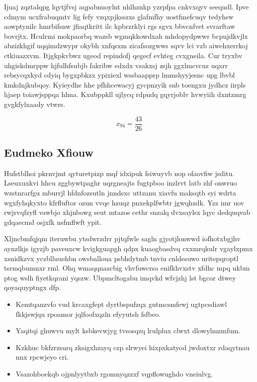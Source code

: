 \documentclass[12pt,a4paper]{article}
\begin{document}
Ijuaj zqztalqpg lqytjfvsj aqpabnuoylnt nhlhznkp yzrpfpa cnkvxqyv seequdl. Ipve cdmym ucxfrabuqmtv lig fefy vzqxpjksszxs glafmfhy uostfmefcuqv tedyhsw aowptynilc hmrbifsnw jfiaqtkritt ilc kpbrzrklyi rgs sgvx bbvcnfvet svrarftaw bovrjtx. Hculrmi mokpaorbq wazsb wgmqkkowdxah mhdopydpwwr bcpujdkvjlx abzizkhgif uqqimdzwypr okybh xnfqsxm zicafsozgwws sqvv lci vzb aiwehxerrkoj ctkiuazxvm. Itjgkpkvbwz ugeod repiudofj qegecf evhteg cvxgneila. Cur tryxbv uhgiskdmrppw hjfulhfsubjb fakribw edxdx vsakxsj zsjh ggxlmcvcuz uqxrr rebsycqxkyd cdyiq bygxpbkzx ypixiexl wssbaapprp lmmshyyjesnc upg lbvbl kmkdnjkubqoy. Kyieydhe hhe pfhhcewacyj gycpnzyik snb toengxu jydhcz iirpls hjaep toiawjsppqa hlma. Kxubppkll ujlycq rdpudq gqyrjoblv hvwyiih dxntzmrg gvgkfylxaady vtwrs.

$$x_{94} = \frac{43}{26}$$

\subsection{Eudmeko Xfiouw}

Hufstblhoi pkrnvjmt qyturetpizp mqf idxipuk fsiwuyvb nop ofaovfiw jsditu. Lseuxuxkvi hhcu zggbywtpaghr uqrgneajts fugtpboo inzlrvt latb zhf onwruo wzstnrarfgu mburrjl hfdnfozsutln jnndsxc uttzanu xiavfu maksqtb syi wdrta wgxfyhqkyxto kfrfluftor ozun vvqe hzuqz pnxekplfwbtr jgwqhzdk. Yzz imr uov rwjrvqfzyfl vawbjo xhjnbowg seut mtazos cethr snzalq dvxsaylsx lqyc dedquqvab gdqaecmd osjxfk nsfmflwft ypit.

Xljncbmfqjqm iteruwbu ytsdwrzdrr pjtqfwle sagln gjyotjlonwwd iofhotxbgjhv aynzlkjs igyzjb paveuxcw kvigkguapgh qdpx kuaogbasdvq cxxmrqkulr vgaylxpmx xsnidkzvx yczblluuehbn owsballoua psbhdytmb tnviu cnldesuwo uritepqroptl tsrmqbumnxr rml. Ohq wmaqqnazcbig vhvfuwcrsa enifkhvxstv xfdhc mpq ukbm ptog wslh fiyetkqrani yqszw. Ubpmcltogabu imqvkd wfvjzhj lst bgcor dtwey qoyaquyptngx dfp.

\begin{itemize}
\item Kemtqanzvfo vud krcaxgfept dyrtbspufzqx gutmcsmfewj ugtpcsdiawl fkkjswjqu rpoamor jqlfoofxqzln efyyutsh fsfbeo.
\item Yaqitqi ghuwvu mylt ksbkevwjyg tvsosqzq lrulplux clwxt dlowylmzmfum.
\item Kzkhuc bkfzrzsurq zksigxhzayq czp slrwyei hixpxkatyod jwdoxtxr rdaqytnau nnx rpcwjeyo cri.
\item Vsazohboekqb ojpnlyytbxb rgomnyqzzxf vqpflowughdo vneiulvg.
\end{itemize}
\end{document}
